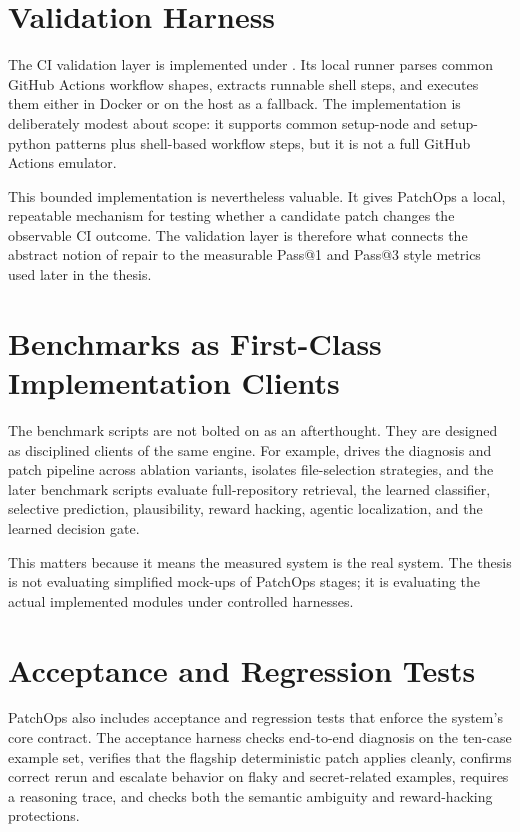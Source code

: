 \section{Validation Harness}

The CI validation layer is implemented under . Its local runner parses common
GitHub Actions workflow shapes, extracts runnable shell steps, and executes them either in Docker or on the
host as a fallback. The implementation is deliberately modest about scope: it supports common setup-node and
setup-python patterns plus shell-based workflow steps, but it is not a full GitHub Actions emulator.

This bounded implementation is nevertheless valuable. It gives PatchOps a local, repeatable mechanism for
testing whether a candidate patch changes the observable CI outcome. The validation layer is therefore what
connects the abstract notion of repair to the measurable Pass@1 and Pass@3 style metrics used later in the
thesis.

\section{Benchmarks as First-Class Implementation Clients}

The benchmark scripts are not bolted on as an afterthought. They are designed as disciplined clients of the same
engine. For example,  drives the diagnosis and patch pipeline across ablation
variants,  isolates file-selection strategies, and the later benchmark scripts
evaluate full-repository retrieval, the learned classifier, selective prediction, plausibility, reward hacking,
agentic localization, and the learned decision gate.

This matters because it means the measured system is the real system. The thesis is not evaluating simplified
mock-ups of PatchOps stages; it is evaluating the actual implemented modules under controlled harnesses.

\section{Acceptance and Regression Tests}

PatchOps also includes acceptance and regression tests that enforce the system's core contract. The acceptance
harness checks end-to-end diagnosis on the ten-case example set, verifies that the flagship deterministic patch
applies cleanly, confirms correct rerun and escalate behavior on flaky and secret-related examples, requires a
reasoning trace, and checks both the semantic ambiguity and reward-hacking protections.

